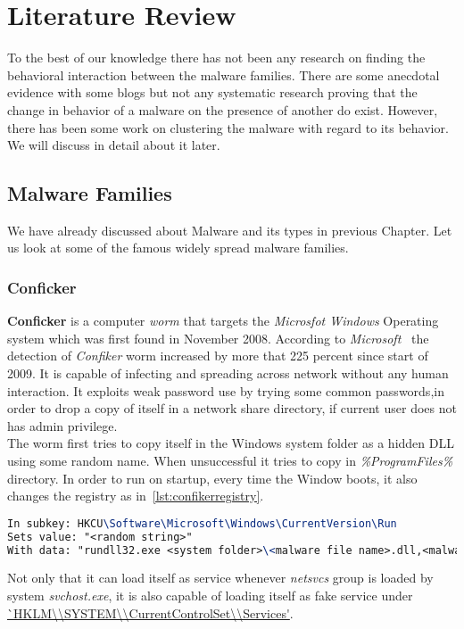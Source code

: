 \chapter{Literature Review}\label{chapter:literature_review}
To the best of our knowledge there has not been any research on finding the behavioral interaction between the malware families.
There are some anecdotal evidence with some blogs but not any systematic research proving that the change in behavior of a malware on the presence of another do exist.
However, there has been some work on clustering the malware with regard to its behavior. We will discuss in detail about it later.\\
\section{Malware Families}
\label{sec:Malware Families}
We have already discussed about Malware and its types in previous Chapter. Let us look at some of the famous widely spread malware families.\\
\subsection{Conficker}
\label{sub:Conficker}
\textbf{Conficker} is a computer \emph{worm} that targets the \emph{Microsfot Windows} Operating system which was first found in November 2008.
According to \emph{Microsoft}~\cite[Worm:Win32/Conficker.B]{conficker} the detection of \emph{Confiker} worm increased by more that 225 percent since start of 2009.
It is capable of infecting and spreading across network without any human interaction.
It exploits weak password use by trying some common passwords,in order to drop a copy of itself in a network share directory, if current user does not has admin privilege.\\
The worm first tries to copy itself in the Windows system folder as a hidden DLL using some random name. When unsuccessful it tries to copy in \emph{\%ProgramFiles\%} directory.
In order to run on startup, every time the Window boots, it also changes the registry as in~\autoref{lst:confikerregistry}.
\begin{lstlisting}[language=TeX,caption={Registry key created by Confiker worm for autostart},label={lst:confikerregistry}]
In subkey: HKCU\Software\Microsoft\Windows\CurrentVersion\Run
Sets value: "<random string>"
With data: "rundll32.exe <system folder>\<malware file name>.dll,<malware parameters>"
\end{lstlisting}
Not only that it can load itself as service whenever \emph{netsvcs} group is loaded by system \emph{svchost.exe},
it is also capable of loading itself as fake service under \url{`HKLM\\SYSTEM\\CurrentControlSet\\Services'}.
